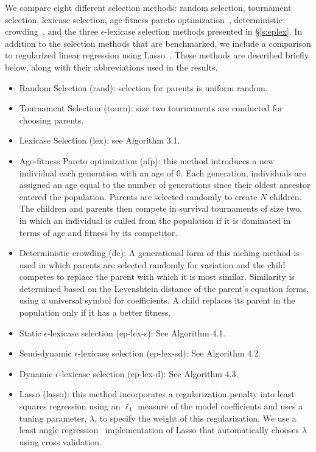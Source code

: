 \documentclass[twoside]{article}
\begin{document}
We compare eight different selection methods: random selection, tournament selection, lexicase selection, age-fitness pareto optimization~\citep{schmidt_age-fitness_2011}, deterministic crowding~\citep{mahfoud_niching_1995}, and the three $\epsilon$-lexicase selection methods presented in \S\ref{s:eplex}. In addition to the selection methods that are benchmarked, we include a comparison to regularized linear regression using Lasso~\citep{tibshirani_regression_1996}. These methods are described briefly below, along with their abbreviations used in the results.
\begin{itemize}
\item Random Selection (rand): selection for parents is uniform random.
\item Tournament Selection (tourn): size two tournaments are conducted for choosing parents. 
\item Lexicase Selection (lex): see Algorithm 3.1. 
\item Age-fitness Pareto optimization (afp): this method introduces a new individual each generation with an age of 0. Each generation, individuals are assigned an age equal to the number of generations since their oldest ancestor entered the population. Parents are selected randomly to create $N$ children. The children and parents then compete in survival tournaments of size two, in which an individual is culled from the population if it is dominated in terms of age and fitness by its competitor. 
\item Deterministic crowding (dc): A generational form of this niching method is used in which parents are selected randomly for variation and the child competes to replace the parent with which it is most similar. Similarity is determined based on the Levenshtein distance of the parent's equation forms, using a universal symbol for coefficients. A child replaces its parent in the population only if it has a better fitness.
\item Static $\epsilon$-lexicase selection (ep-lex-s): See Algorithm 4.1.
\item Semi-dynamic $\epsilon$-lexicase selection (ep-lex-sd): See Algorithm 4.2.
\item Dynamic $\epsilon$-lexicase selection (ep-lex-d): See Algorithm 4.3.
\item Lasso (lasso): this method incorporates a regularization penalty into least squares regression using an $\ell_1$ measure of the model coefficients and uses a tuning parameter, $\lambda$, to specify the weight of this regularization. We use a least angle regression~\citep{efron_least_2004} implementation of Lasso that automatically chooses $\lambda$ using cross validation.
\end{itemize} 
\end{document}
